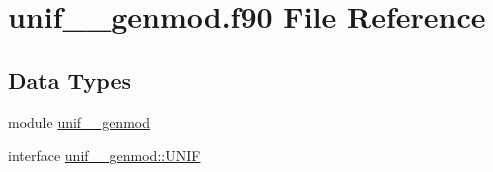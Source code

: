 \hypertarget{unif____genmod_8f90}{\section{unif\+\_\+\+\_\+genmod.\+f90 File Reference}
\label{unif____genmod_8f90}
}
\subsection*{Data Types}
\begin{DoxyCompactItemize}
\item 
module \hyperlink{classunif____genmod}{unif\+\_\+\+\_\+genmod}
\item 
interface \hyperlink{interfaceunif____genmod_1_1UNIF}{unif\+\_\+\+\_\+genmod\+::\+U\+N\+I\+F}
\end{DoxyCompactItemize}
